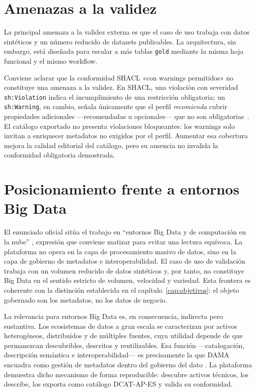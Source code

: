 \section{Amenazas a la validez}

La principal amenaza a la validez externa es que el caso de uso trabaja con datos sintéticos y un número reducido de datasets publicables. La arquitectura, sin embargo, está diseñada para escalar a más tablas \texttt{gold} mediante la misma hoja funcional y el mismo workflow.

Conviene aclarar que la conformidad \ac{SHACL} «con warnings permitidos» no constituye una amenaza a la validez. En \ac{SHACL}, una violación con severidad \texttt{sh:Violation} indica el incumplimiento de una restricción obligatoria; un \texttt{sh:Warning}, en cambio, señala únicamente que el perfil \emph{recomienda} cubrir propiedades adicionales —recomendadas u opcionales— que no son obligatorias~\cite{w3cShacl}. El catálogo exportado no presenta violaciones bloqueantes: los warnings solo invitan a enriquecer metadatos no exigidos por el perfil. Aumentar esa cobertura mejora la calidad editorial del catálogo, pero su ausencia no invalida la conformidad obligatoria demostrada.

\section{Posicionamiento frente a entornos Big Data}\label{sec:posicionamiento-bigdata}

El enunciado oficial sitúa el trabajo en ``entornos Big Data y de computación en la nube'' \cite{uclmFichaTfe2026}, expresión que conviene matizar para evitar una lectura equívoca. La plataforma no opera en la capa de procesamiento masivo de datos, sino en la capa de gobierno de metadatos e interoperabilidad. El caso de uso de validación trabaja con un volumen reducido de datos sintéticos y, por tanto, no constituye Big Data en el sentido estricto de volumen, velocidad y variedad. Esta frontera es coherente con la distinción establecida en el capítulo~\ref{cap:objetivos}: el objeto gobernado son los metadatos, no los datos de negocio.

La relevancia para entornos Big Data es, en consecuencia, indirecta pero sustantiva. Los ecosistemas de datos a gran escala se caracterizan por activos heterogéneos, distribuidos y de múltiples fuentes, cuya utilidad depende de que permanezcan descubribles, descritos y reutilizables. Esa función —catalogación, descripción semántica e interoperabilidad— es precisamente la que DAMA encuadra como gestión de metadatos dentro del gobierno del dato \cite{damaDmbok}. La plataforma demuestra dicho mecanismo de forma reproducible: descubre activos técnicos, los describe, los exporta como catálogo DCAT-AP-ES y valida su conformidad.

